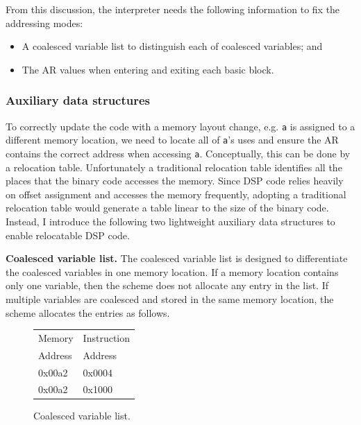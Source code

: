 From this discussion, the interpreter needs the following information to fix the addressing modes:
\begin{itemize}
	\item A coalesced variable list to distinguish each of coalesced variables; and
	\item The AR values when entering and exiting each basic block.
\end{itemize}

\subsubsection{Auxiliary data structures}
To correctly update the code with a memory layout change, e.g. {\tt a} is assigned to a different memory location, we need to locate all of {\tt a}'s uses and ensure the AR contains the correct address when accessing {\tt a}. Conceptually, this can be done by a relocation table. Unfortunately a traditional relocation table identifies all the places that the binary code accesses the memory. Since DSP code relies heavily on offset assignment and accesses the memory frequently, adopting a traditional relocation table would generate a table linear to the size of the binary code. Instead, I introduce the following two lightweight auxiliary data structures to enable relocatable DSP code.

{\bf Coalesced variable list.}
The coalesced variable list is designed to differentiate the coalesced variables in one memory location. If a memory location contains only one variable, then the scheme does not allocate any entry in the list. If multiple variables are coalesced and stored in the same memory location, the scheme allocates the entries as follows. 

\begin{figure}[htdp]
\begin{small}
\begin{center}
\begin{tabular}{p{1in} p{1in} }  \hline
Memory  & Instruction  \\
Address & Address \\ \hline\hline
0x00a2 & 0x0004  \\
0x00a2 & 0x1000  \\ \hline
\end{tabular}
\end{center}
\caption{Coalesced variable list.}
\label{memvar}
\end{small}
\end{figure}

